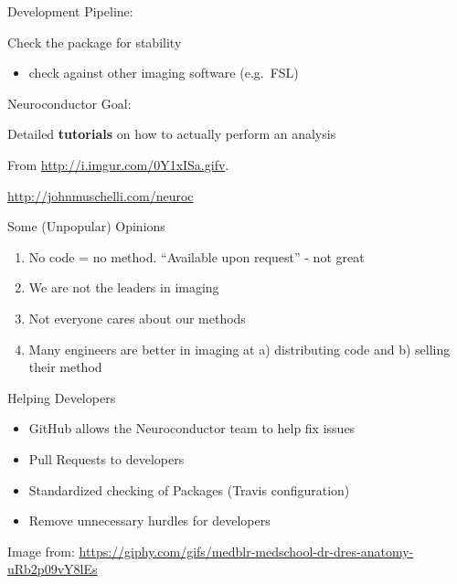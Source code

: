 \documentclass[ignorenonframetext,]{beamer}
\providecommand{\tightlist}{%
  \setlength{\itemsep}{0pt}\setlength{\parskip}{0pt}}
\begin{document}
\begin{frame}

\hypertarget{left_col2}{}
Development Pipeline:

Check the package for stability

\begin{itemize}
\tightlist
\item
  check against other imaging software (e.g.~FSL)
\end{itemize}

\hypertarget{right_col2}{}

\end{frame}

\begin{frame}

\hypertarget{left_col2}{}
Neuroconductor Goal:

Detailed \textbf{tutorials} on how to actually perform an analysis

\hypertarget{right_col2}{}
From \url{http://i.imgur.com/0Y1xISa.gifv}.

\url{http://johnmuschelli.com/neuroc}

\end{frame}

\begin{frame}{Some (Unpopular) Opinions}
\protect\hypertarget{some-unpopular-opinions}{}

\begin{enumerate}
\tightlist
\item
  No code = no method. ``Available upon request'' - not great
\item
  We are not the leaders in imaging
\item
  Not everyone cares about our methods
\item
  Many engineers are better in imaging at a) distributing code and b)
  selling their method
\end{enumerate}

\end{frame}

\begin{frame}{Helping Developers}
\protect\hypertarget{helping-developers}{}

\hypertarget{left_col}{}
\begin{itemize}
\tightlist
\item
  GitHub allows the Neuroconductor team to help fix issues
\item
  Pull Requests to developers
\item
  Standardized checking of Packages (Travis configuration)
\item
  Remove unnecessary hurdles for developers
\end{itemize}

\hypertarget{right_col}{}

Image from:
\url{https://giphy.com/gifs/medblr-medschool-dr-dres-anatomy-uRb2p09vY8lEs}

\end{frame}
\end{document}
